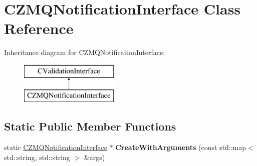 \hypertarget{class_c_z_m_q_notification_interface}{}\section{C\+Z\+M\+Q\+Notification\+Interface Class Reference}
\label{class_c_z_m_q_notification_interface}
Inheritance diagram for C\+Z\+M\+Q\+Notification\+Interface\+:\begin{figure}[H]
\begin{center}
\leavevmode
\includegraphics[height=2.000000cm]{class_c_z_m_q_notification_interface}
\end{center}
\end{figure}
\subsection*{Static Public Member Functions}
\begin{DoxyCompactItemize}
\item 
\mbox{\label{class_c_z_m_q_notification_interface_a791ea8fd1b414482c9a811ac5ae79a26}} 
static \mbox{\hyperlink{class_c_z_m_q_notification_interface}{C\+Z\+M\+Q\+Notification\+Interface}} $\ast$ {\bfseries Create\+With\+Arguments} (const std\+::map$<$ std\+::string, std\+::string $>$ \&args)
\end{DoxyCompactItemize}
